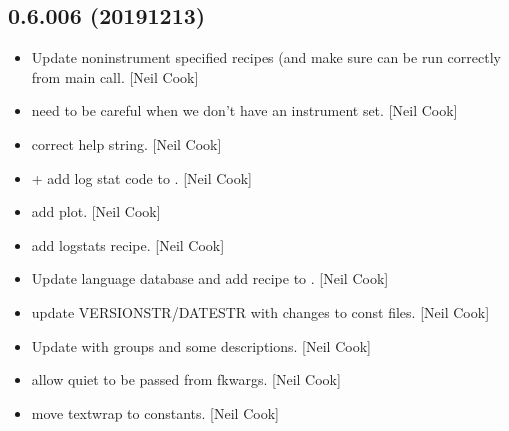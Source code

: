 \documentclass[a4paper,10pt,english]{report}
\begin{document}
\subsection{0.6.006 (2019\sphinxhyphen{}12\sphinxhyphen{}13)}
\label{\detokenize{misc/changelog:id31}}\begin{itemize}
\item {} 
Update non\sphinxhyphen{}instrument specified recipes (and make sure
 can be run correctly from main call. {[}Neil Cook{]}

\item {} 
 \sphinxhyphen{} need to be careful when we don’t have an instrument
set. {[}Neil Cook{]}

\item {} 
 \sphinxhyphen{} correct help string. {[}Neil Cook{]}

\item {} 
 +  \sphinxhyphen{} add
log stat code to . {[}Neil Cook{]}

\item {} 
 \sphinxhyphen{} add  plot. {[}Neil Cook{]}

\item {} 
 \sphinxhyphen{} add logstats recipe.
{[}Neil Cook{]}

\item {} 
Update language database and add recipe to . {[}Neil Cook{]}

\item {} 
 \sphinxhyphen{} update
VERSIONSTR/DATESTR with changes to const files. {[}Neil Cook{]}

\item {} 
Update  with groups and some
descriptions. {[}Neil Cook{]}

\item {} 
 \sphinxhyphen{} allow quiet to be passed from fkwargs.
{[}Neil Cook{]}

\item {} 
 \sphinxhyphen{} move textwrap to constants. {[}Neil Cook{]}


\end{itemize}
\end{document}
